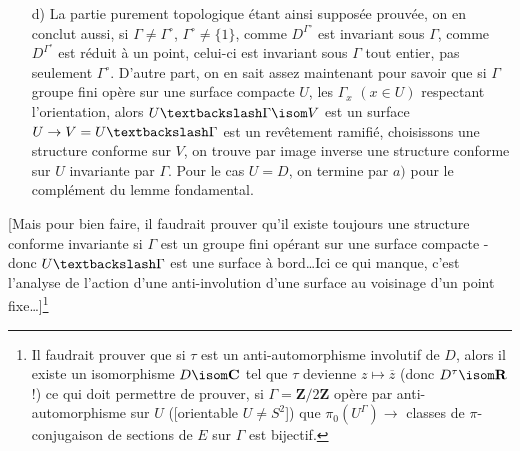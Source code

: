 \begin{enumerate}
    \item[d)] La partie purement topologique étant ainsi supposée prouvée, on en conclut aussi, si $\Gamma \neq \Gamma^\circ$, $\Gamma^\circ \neq \{ 1 \}$, comme $D^{\Gamma^\circ}$ est invariant sous $\Gamma$, comme $D^{\Gamma^\circ}$ est réduit à un point, celui-ci est invariant sous $\Gamma$ tout entier, pas seulement $\Gamma^\circ$. D'autre part, on en sait assez maintenant pour savoir que si $\Gamma$ groupe fini opère sur une surface compacte $U$, les $\Gamma_x$ $(x \in U)$ respectant l'orientation, alors $U \textbackslash \Gamma \isom V$ est un surface $U \to V = U \textbackslash \Gamma$ est un revêtement ramifié, choisissons une structure conforme sur $V$, on trouve par image   inverse une structure conforme sur $U$ invariante par $\Gamma$. Pour le cas $U = D$, on termine par $a)$ pour le complément du lemme fondamental.
\end{enumerate}

[Mais pour bien faire, il faudrait prouver qu'il existe toujours une structure conforme invariante si $\Gamma$ est un groupe fini opérant sur une surface compacte - donc $U \textbackslash \Gamma$ est une surface à bord\dots Ici ce qui manque, c'est l'analyse de l'action d'une anti-involution d'une surface au voisinage d'un point fixe\dots]\footnote{Il faudrait prouver que si $\tau$ est un anti-automorphisme involutif de $D$, alors il existe un isomorphisme $D \isom \mathbf{C}$ tel que $\tau$ devienne $z \mapsto \overline{z}$ (donc $D^\tau \isom \mathbf{R}$ !) ce qui doit permettre de prouver, si $\Gamma = \mathbf{Z}/2\mathbf{Z}$ opère par anti-automorphisme sur $U$ ([orientable $U \neq S^2$]) que $\pi_0 (U^\Gamma) \to $ classes de $\pi$-conjugaison de sections de $E$ sur $\Gamma$ est bijectif.}

